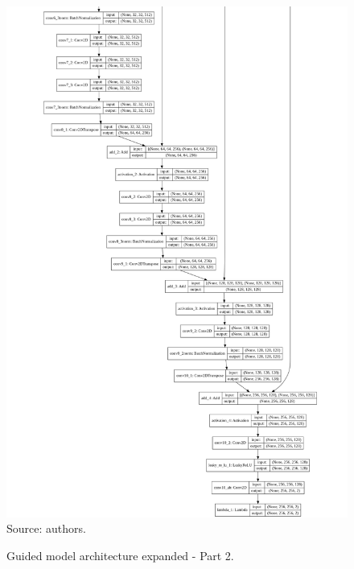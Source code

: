 \documentclass[12pt,openright,oneside,a4paper,english, brazilian]{abntex2}
\begin{document}
\begin{otherlanguage}{english}
\begin{apendicesenv}
\begin{figure}[!htb]
\centering
\caption{Guided model architecture expanded - Part 2.}
\includegraphics[height=\textheight - 38pt,keepaspectratio]{model_plot/Guided2}
Source: authors.
\label{guided_plot_2}
\end{figure}



\end{apendicesenv}
\end{otherlanguage}
\end{document}
